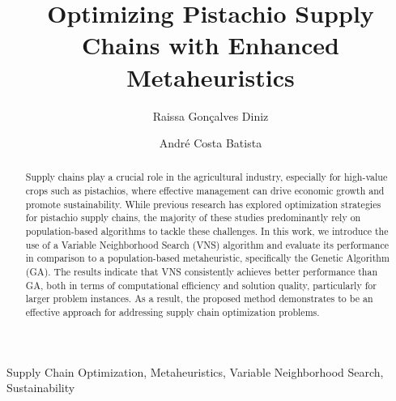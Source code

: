 \documentclass[a4paper]{ifacconf}
\begin{document}
\begin{frontmatter}

\title{Optimizing Pistachio Supply Chains with Enhanced Metaheuristics}

\author[First]{Raissa Gon\c{c}alves Diniz} 
\author[Second]{Andr\'e Costa Batista} 

\address[First]{Operations Research and Complex Systems Laboratory, Universidade Federal de Minas Gerais, Brazil (e-mail: raissagd@ufmg.br).}
\address[Second]{Department of Electrical Engineering, Universidade Federal de Minas Gerais, Av. Ant\^onio Carlos 6627, Belo Horizonte, 31270-010, Minas Gerais, Brazil (e-mail: andre-costa@ufmg.br).}

\renewcommand{\abstractname}{{\bf Abstract:~}}   

\begin{abstract}                
Supply chains play a crucial role in the agricultural industry, especially for high-value crops such as pistachios, where effective management can drive economic growth and promote sustainability. While previous research has explored optimization strategies for pistachio supply chains, the majority of these studies predominantly rely on population-based algorithms to tackle these challenges. In this work, we introduce the use of a Variable Neighborhood Search (VNS) algorithm and evaluate its performance in comparison to a population-based metaheuristic, specifically the Genetic Algorithm (GA). The results indicate that VNS consistently achieves better performance than GA, both in terms of computational efficiency and solution quality, particularly for larger problem instances. As a result, the proposed method demonstrates to be an effective approach for addressing supply chain optimization problems.
\end{abstract}

\begin{keyword}
Supply Chain Optimization, Metaheuristics, Variable Neighborhood Search, Sustainability
\end{keyword}

\end{frontmatter}

\end{document}

